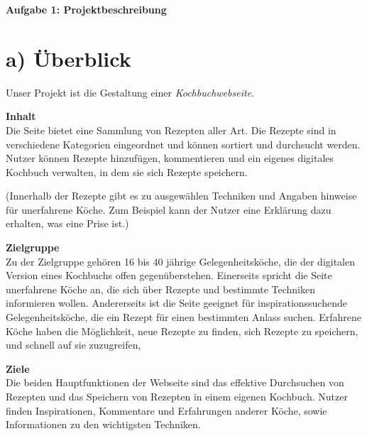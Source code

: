 \documentclass[parskip,10pt,abstracton]{scrartcl}
\renewcommand*{\maketitle}{%
	{\centering\LARGE\sffamily\bfseries Aufgabe 1: Projektbeschreibung \par}
	\vspace{3em}
}
\begin{document}
\maketitle


\section*{a) Überblick}

Unser Projekt ist die Gestaltung einer \textit{Kochbuchwebseite}.

\textbf{Inhalt}\\
Die Seite bietet eine Sammlung von Rezepten aller Art.
Die Rezepte sind in verschiedene Kategorien eingeordnet und können sortiert und durchsucht werden.
Nutzer können Rezepte hinzufügen, kommentieren und ein eigenes digitales Kochbuch verwalten, in dem sie sich Rezepte speichern.

(Innerhalb der Rezepte gibt es zu ausgewählen Techniken und Angaben hinweise für unerfahrene Köche. Zum Beispiel kann der Nutzer eine Erklärung dazu erhalten, was eine Prise ist.)

\textbf{Zielgruppe}\\
Zu der Zielgruppe gehören 16 bis 40 jährige Gelegenheitsköche, die der digitalen Version eines Kochbuchs offen gegenüberstehen.
Einerseits spricht die Seite unerfahrene Köche an, die sich über Rezepte und bestimmte Techniken informieren wollen. Andererseits ist die Seite geeignet für inspirationssuchende Gelegenheitsköche, die ein Rezept für einen bestimmten Anlass suchen. Erfahrene Köche haben die Möglichkeit, neue Rezepte zu finden, sich Rezepte zu speichern, und schnell auf sie zuzugreifen,

\textbf{Ziele} \\
Die beiden Hauptfunktionen der Webseite sind das effektive Durchsuchen von Rezepten und das Speichern von Rezepten in einem eigenen Kochbuch. Nutzer finden Inspirationen, Kommentare und Erfahrungen anderer Köche, sowie Informationen zu den wichtigsten Techniken.

% 
% 
\end{document}
